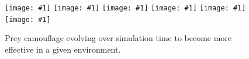\documentclass[letterpaper]{article}
\newcommand{\igsix}[1]{\texttt{[image: \#1]}}
\begin{document}


\begin{figure}
    \igsix{20221030_1220_step_19.png}
    \hfill
    \igsix{20221030_1220_step_1045.png}
    \hfill
    \igsix{20221030_1220_step_2014.png}
    \hfill
    \igsix{20221030_1220_step_3059.png}
    \hfill
    \igsix{20221030_1220_step_6650.png}
    \hfill
    \igsix{20221030_1220_step_7467.png}
    \caption{Prey camouflage evolving over simulation time to become more effective in a given environment.}
    \label{fig:time_sequence}
\end{figure}

\end{document}

